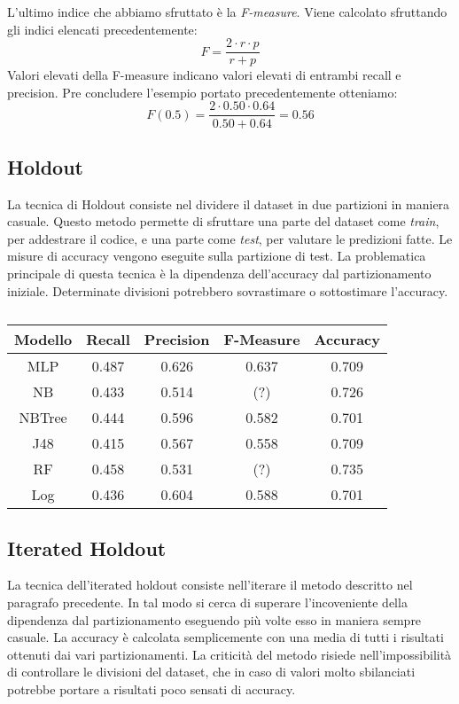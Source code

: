 L'ultimo indice che abbiamo sfruttato è la \textit{F-measure}. Viene calcolato sfruttando gli indici elencati precedentemente:
\[F = \frac{2\cdot r \cdot p}{r + p}\]
Valori elevati della F-measure indicano valori elevati di entrambi recall e precision. Pre concludere l'esempio portato precedentemente otteniamo:
\[F(0.5) = \frac{2 \cdot 0.50 \cdot 0.64}{0.50 + 0.64}=0.56\]


\subsection{Holdout}



La tecnica di Holdout consiste nel dividere il dataset in due partizioni in maniera casuale. Questo metodo permette di sfruttare una parte del dataset come \textit{train}, per addestrare il codice, e una parte come \textit{test}, per valutare le predizioni fatte. Le misure di accuracy vengono eseguite sulla partizione di test. 
La problematica principale di questa tecnica è la dipendenza dell'accuracy dal partizionamento iniziale. Determinate divisioni potrebbero sovrastimare o sottostimare l'accuracy.


\begin{table}[H]
\tabcolsep=0.10cm
\small
    \centering
    \begin{tabular}{ccccc}
     Modello & Recall & Precision & F-Measure & Accuracy  \\
     \hline
     MLP & 0.487 & 0.626 & 0.637 & 0.709 \\
     NB & 0.433 & 0.514 & (?) & 0.726 \\
     NBTree & 0.444 & 0.596 & 0.582 & 0.701 \\
     J48 & 0.415 & 0.567 & 0.558 & 0.709 \\
     RF & 0.458 & 0.531 & (?) & 0.735 \\
     Log & 0.436 & 0.604 & 0.588 & 0.701 \\
    \hline    
    \end{tabular}
    \caption{}
    \label{nuioahnaumdfuamhmadsuamhasfudhdsfmhmfasdmhm}
\end{table}




\subsection{Iterated Holdout}

La tecnica dell'iterated holdout consiste nell'iterare il metodo descritto nel paragrafo precedente. In tal modo si cerca di superare l'incoveniente della dipendenza dal partizionamento eseguendo più volte esso in maniera sempre casuale. La accuracy è calcolata semplicemente con una media di tutti i risultati ottenuti dai vari partizionamenti. La criticità del metodo risiede nell'impossibilità di controllare le divisioni del dataset, che in caso di valori molto sbilanciati potrebbe portare a risultati poco sensati di accuracy.


